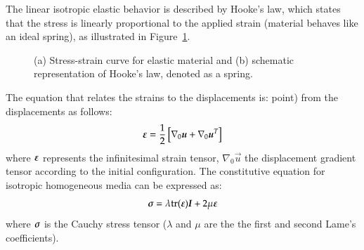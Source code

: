 The linear isotropic elastic behavior is described by Hooke's law, which states
that the stress is linearly proportional to the applied strain (material behaves
like an ideal spring), as illustrated in Figure~\ref{fig:smm:cl:elastic}.
\begin{figure}[!htb]
  \begin{center}

    \hspace{0.05\textwidth} 
    \caption{(a) Stress-strain curve for elastic material and (b)
      schematic representation of Hooke's law, denoted as a spring.}
    \label{fig:smm:cl:elastic}
  \end{center}
\end{figure}
The equation that relates the strains to the
displacements is: %
point) from the displacements as follows:
\begin{equation}
  \label{eqn:smm:strain_inf}
  \boldsymbol{\varepsilon} =
  \frac{1}{2} \left[ \nabla_0 \boldsymbol{u}+\nabla_0 \boldsymbol{u}^T \right]
\end{equation}
where $\boldsymbol{\varepsilon}$ represents the infinitesimal strain tensor,
$\nabla_{0}\vec{u}$ the displacement gradient
tensor according to the initial configuration. The constitutive equation
for isotropic homogeneous media can be expressed as:
\begin{equation}
  \label{eqn:smm:material:constitutive_elastic}
  \boldsymbol{\sigma } =\lambda\mathrm{tr}(\boldsymbol{\varepsilon})\boldsymbol{I}+2 \mu\boldsymbol{\varepsilon}
\end{equation}
where $\boldsymbol{\sigma}$ is the Cauchy stress tensor
($\lambda$ and $\mu$ are the the first and second Lame's
coefficients).

